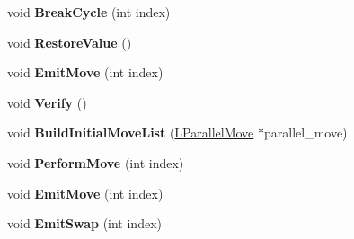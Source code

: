 \begin{DoxyCompactItemize}
\item 
void {\bfseries Break\+Cycle} (int index)\hypertarget{classv8_1_1internal_1_1_b_a_s_e___e_m_b_e_d_d_e_d_a5de6146d54eea60dd1d47b73b51a4905}{}\label{classv8_1_1internal_1_1_b_a_s_e___e_m_b_e_d_d_e_d_a5de6146d54eea60dd1d47b73b51a4905}

\item 
void {\bfseries Restore\+Value} ()\hypertarget{classv8_1_1internal_1_1_b_a_s_e___e_m_b_e_d_d_e_d_a5dca5ddf8849980c4195449ae562e8b9}{}\label{classv8_1_1internal_1_1_b_a_s_e___e_m_b_e_d_d_e_d_a5dca5ddf8849980c4195449ae562e8b9}

\item 
void {\bfseries Emit\+Move} (int index)\hypertarget{classv8_1_1internal_1_1_b_a_s_e___e_m_b_e_d_d_e_d_a50988d2a86b49713575ec93e3c922dcf}{}\label{classv8_1_1internal_1_1_b_a_s_e___e_m_b_e_d_d_e_d_a50988d2a86b49713575ec93e3c922dcf}

\item 
void {\bfseries Verify} ()\hypertarget{classv8_1_1internal_1_1_b_a_s_e___e_m_b_e_d_d_e_d_a46f1b6e1093c631ee3b7dfca3abc94e9}{}\label{classv8_1_1internal_1_1_b_a_s_e___e_m_b_e_d_d_e_d_a46f1b6e1093c631ee3b7dfca3abc94e9}

\item 
void {\bfseries Build\+Initial\+Move\+List} (\hyperlink{classv8_1_1internal_1_1_l_parallel_move}{L\+Parallel\+Move} $\ast$parallel\+\_\+move)\hypertarget{classv8_1_1internal_1_1_b_a_s_e___e_m_b_e_d_d_e_d_a18e46b4919bd34c5ff192a955f86238d}{}\label{classv8_1_1internal_1_1_b_a_s_e___e_m_b_e_d_d_e_d_a18e46b4919bd34c5ff192a955f86238d}

\item 
void {\bfseries Perform\+Move} (int index)\hypertarget{classv8_1_1internal_1_1_b_a_s_e___e_m_b_e_d_d_e_d_a01fea4beaf81ccc3a326c14fdda8a2aa}{}\label{classv8_1_1internal_1_1_b_a_s_e___e_m_b_e_d_d_e_d_a01fea4beaf81ccc3a326c14fdda8a2aa}

\item 
void {\bfseries Emit\+Move} (int index)\hypertarget{classv8_1_1internal_1_1_b_a_s_e___e_m_b_e_d_d_e_d_a50988d2a86b49713575ec93e3c922dcf}{}\label{classv8_1_1internal_1_1_b_a_s_e___e_m_b_e_d_d_e_d_a50988d2a86b49713575ec93e3c922dcf}

\item 
void {\bfseries Emit\+Swap} (int index)\hypertarget{classv8_1_1internal_1_1_b_a_s_e___e_m_b_e_d_d_e_d_ad8b20a6e68d3330b407c5a5c71838ca4}{}\label{classv8_1_1internal_1_1_b_a_s_e___e_m_b_e_d_d_e_d_ad8b20a6e68d3330b407c5a5c71838ca4}


\end{DoxyCompactItemize}
